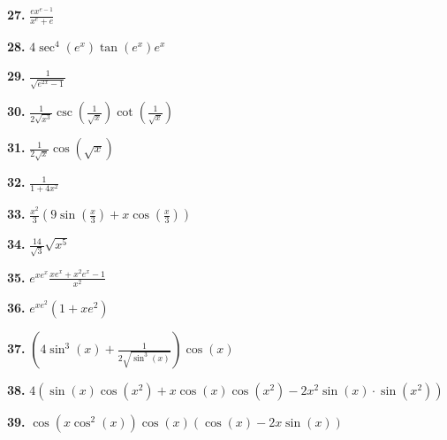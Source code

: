 \documentclass[12pt,]{book}
\theoremstyle{plain}
\theoremstyle{definition}
\numberwithin{equation}{section}
\newcommand{\fe}[2]{#1\mathopen{}\left(#2\right)\mathclose{}}
\begin{document}
                \par\smallskip
\noindent\textbf{27.}\quad{}
                    \(\frac{ex^{e-1}}{x^e+e}\)%

                \par\smallskip
\noindent\textbf{28.}\quad{}
                    \(4\fe{\sec^4}{e^x}\fe{\tan}{e^x}e^x\)%

                \par\smallskip
\noindent\textbf{29.}\quad{}
                    \(\frac{1}{\sqrt{e^{2x}-1}}\)%

                \par\smallskip
\noindent\textbf{30.}\quad{}
                    \(\frac{1}{2\sqrt{x^3}}\fe{\csc}{\frac{1}{\sqrt{x}}}\fe{\cot}{\frac{1}{\sqrt{x}}}\)%

                \par\smallskip
\noindent\textbf{31.}\quad{}
                    \(\frac{1}{2\sqrt{x}}\fe{\cos}{\sqrt{x}}\)%

                \par\smallskip
\noindent\textbf{32.}\quad{}
                    \(\frac{1}{1+4x^2}\)%

                \par\smallskip
\noindent\textbf{33.}\quad{}
                    \(\frac{x^2}{3}\left(9\fe{\sin}{\frac{x}{3}}+x\fe{\cos}{\frac{x}{3}}\right)\)%

                \par\smallskip
\noindent\textbf{34.}\quad{}
                    \(\frac{14}{\sqrt{3}}\sqrt{x^5}\)%

                \par\smallskip
\noindent\textbf{35.}\quad{}
                    \(e^{xe^x}\frac{xe^x+x^2e^x-1}{x^2}\)%

                \par\smallskip
\noindent\textbf{36.}\quad{}
                    \(e^{xe^2}\left(1+xe^2\right)\)%

                \par\smallskip
\noindent\textbf{37.}\quad{}
                    \(\left(4\fe{\sin^3}{x}+\frac{1}{2\sqrt{\fe{\sin^3}{x}}}\right)\fe{\cos}{x}\)%

                \par\smallskip
\noindent\textbf{38.}\quad{}
                    \(4\left(\fe{\sin}{x}\fe{\cos}{x^2}+x\fe{\cos}{x}\fe{\cos}{x^2}-2x^2\fe{\sin}{x}\cdot\fe{\sin}{x^2}\right)\)%

                \par\smallskip
\noindent\textbf{39.}\quad{}
                    \(\fe{\cos}{x\fe{\cos^2}{x}}\fe{\cos}{x}\left(\fe{\cos}{x}-2x\fe{\sin}{x}\right)\)%
\end{document}
